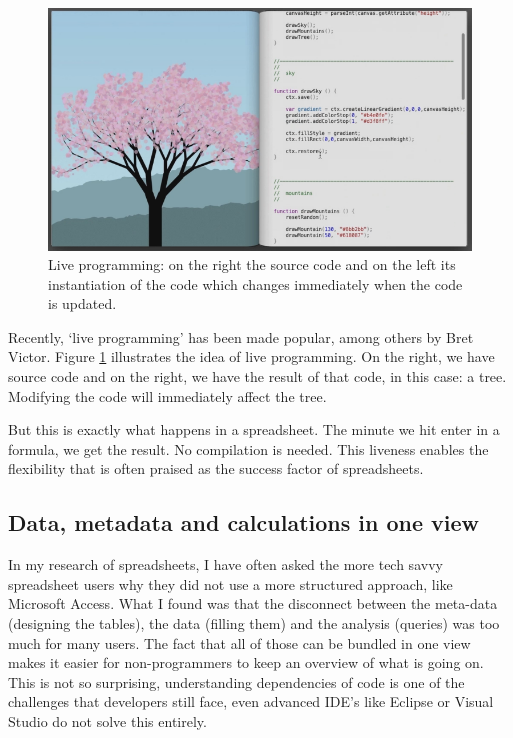 \documentclass[conference]{IEEEtran}
\begin{document}
\begin{figure}
  \begin{center}
  \includegraphics[width=\columnwidth]{fig/bret.png}
  \caption{Live programming: on the right the source code and on the left its instantiation of the code which changes immediately when the code is updated.}
  \label{fig:bret}
  \end{center}
\end{figure} 


Recently, ‘live programming’ has been made popular, among others by Bret Victor. Figure \ref{fig:bret} illustrates the idea of live programming. On the right, we have source code and on the right, we have the result of that code, in this case: a tree. Modifying the code will immediately affect the tree.
 
But this is exactly what happens in a spreadsheet. The minute we hit enter in a formula, we get the result. No compilation is needed. This liveness enables the flexibility that is often praised as the success factor of spreadsheets.

\subsection{Data, metadata and calculations in one view}
In my research of spreadsheets, I have often asked the more tech savvy spreadsheet users why they did not use a more structured approach, like Microsoft Access. What I found was that the disconnect between the meta-data (designing the tables), the data (filling them) and the analysis (queries) was too much for many users. The fact that all of those can be bundled in one view makes it easier for non-programmers to keep an overview of what is going on. This is not so surprising, understanding dependencies of code is one of the challenges that developers still face, even advanced IDE's like Eclipse or Visual Studio do not solve this entirely. 
\end{document}

